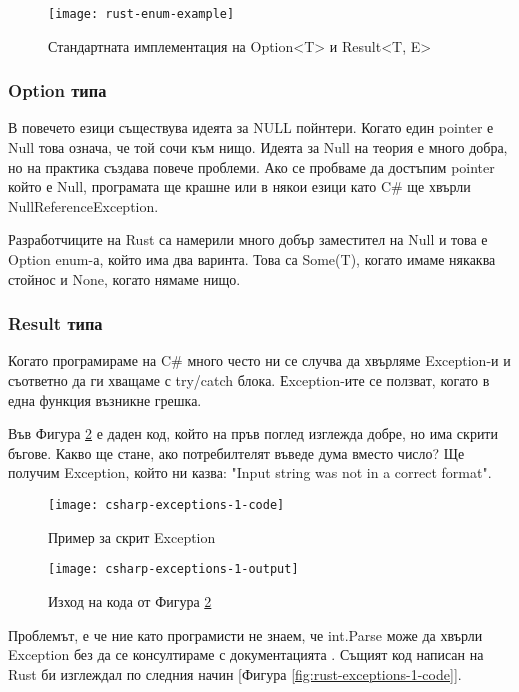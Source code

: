 \begin{figure}[!htb]
  \texttt{[image: rust-enum-example]}
  \centering
  \caption{Стандартната имплементация на Option<T> и Result<T, E>}
  \label{fig:rust-enum-example}
\end{figure}

\subsubsection{Option типа}
В повечето езици съществува идеята за NULL пойнтери. Когато един pointer е Null
това означа, че той сочи към нищо. Идеята за Null на теория е много добра, но
на практика създава повече проблеми. Ако се пробваме да достъпим pointer който
е Null, програмата ще крашне или в някои езици като C\# ще хвърли
NullReferenceException.

Разработчиците на Rust са намерили много добър заместител на Null и това е
Option enum-а, който има два варинта. Това са Some(T), когато имаме някаква
стойнос и None, когато нямаме нищо.

\subsubsection{Result типа}
Когато програмираме на C\# много често ни се случва да хвърляме Exception-и и
съответно да ги хващаме с try/catch блока. Еxception-ите се ползват, когато в
една функция възникне грешка.

Във Фигура \ref{fig:csharp-exceptions-1-code} е даден код, който на пръв поглед
изглежда добре, но има скрити бъгове. Какво ще стане, ако потребилтелят въведе
дума вместо число? Ще получим Exception, който ни казва: "Input string was not
in a correct format".
\begin{figure}[!htb]
  \texttt{[image: csharp-exceptions-1-code]}
  \centering
  \caption{Пример за скрит Exception}
  \label{fig:csharp-exceptions-1-code}
\end{figure}

\newpage

\begin{figure}[!htb]
  \texttt{[image: csharp-exceptions-1-output]}
  \centering
  \caption{Изход на кода от Фигура \ref{fig:csharp-exceptions-1-code}}
  \label{fig:csharp-exceptions-1-output}
\end{figure}

Проблемът, е че ние като програмисти не знаем, че int.Parse може да хвърли
Exception без да се консултираме с документацията \cite{CSharp_Int_Parse}.
Същият код написан на Rust би изглеждал по следния начин [Фигура \ref{fig:rust-exceptions-1-code}].

